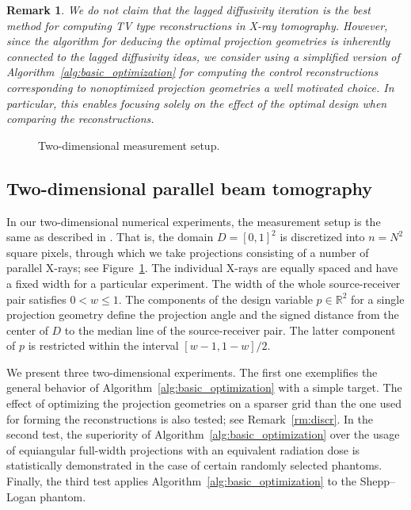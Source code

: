 \documentclass[final]{siamltex}
\newcommand{\R}{\mathbb{R}}
\newtheorem{remark}[theorem]{Remark}
\begin{document}
\begin{remark}
We do not claim that the lagged diffusivity iteration is the best method for computing TV type reconstructions in X-ray tomography. However, since the algorithm for deducing the optimal projection geometries is inherently connected to the lagged diffusivity ideas, we consider using a simplified version of Algorithm~\ref{alg:basic_optimization} for computing the control reconstructions corresponding to nonoptimized projection geometries a well motivated choice. In particular, this enables focusing solely on the effect of the optimal design when comparing the reconstructions.
  \end{remark}


\begin{figure}[t]
	\centering
	
	\caption{Two-dimensional measurement setup.}
        \label{fig:2Dgeometry}
\end{figure}


\subsection{Two-dimensional parallel beam tomography}
In our two-dimensional numerical experiments, the measurement setup is the same as described in \cite{Burger21}. That is, the domain $D = [0,1]^2$ is discretized into $n = N^2$ square pixels, through which we take projections consisting of a number of parallel X-rays; see Figure~\ref{fig:2Dgeometry}. The individual X-rays are equally spaced and have a fixed width for a particular experiment. The width of the whole source-receiver pair satisfies $0< w \leq 1$. The components of the design variable $p \in \R^2$ for a single projection geometry define the projection angle and the signed distance from the center of $D$ to the median line of the source-receiver pair. The latter component of $p$ is restricted within the interval $[w-1, 1-w]/2$.


We present three two-dimensional experiments. The first one exemplifies the general behavior of Algorithm~\ref{alg:basic_optimization} with a simple target. The effect of optimizing the projection geometries on a sparser grid than the one used for forming the reconstructions is also tested; see Remark~\ref{rm:discr}. In the second test, the superiority of Algorithm~\ref{alg:basic_optimization} over the usage of equiangular full-width projections with an equivalent radiation dose is statistically demonstrated in the case of certain randomly selected phantoms. Finally, the third test applies Algorithm~\ref{alg:basic_optimization} to the Shepp--Logan phantom.
\end{document}

